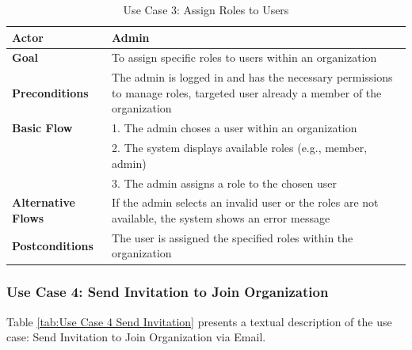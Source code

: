 \begin{table}[ht]
	\centering
	\begin{tabularx}{\textwidth}{|l|X|}
		\hline
		\textbf{Actor}             & Admin                                                                                                                        \\
		\hline
		\textbf{Goal}              & To assign specific roles to users within an organization                                                                     \\
		\hline
		\textbf{Preconditions}     & The admin is logged in and has the necessary permissions to manage roles, targeted user already a member of the organization \\
		\hline
		\textbf{Basic Flow}        & 1. The admin choses a user within an organization                                                                            \\
		                           & 2. The system displays available roles (e.g., member, admin)                                                                 \\
		                           & 3. The admin assigns a role to the chosen user                                                                               \\
		\hline
		\textbf{Alternative Flows} & If the admin selects an invalid user or the roles are not available, the system shows an error message                       \\
		\hline
		\textbf{Postconditions}    & The user is assigned the specified roles within the organization                                                             \\
		\hline
	\end{tabularx}
	\caption{Use Case 3: Assign Roles to Users}
	\label{tab:Use Case 3 Assign Roles to Users}
\end{table}

\subsubsection{Use Case 4: Send Invitation to Join Organization}

Table \ref{tab:Use Case 4 Send Invitation} presents a textual description of the use case: Send Invitation to Join Organization via Email.

